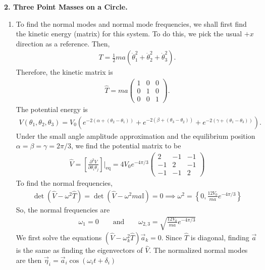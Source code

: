 \documentclass{article}
\theoremstyle{definition}
\newcommand{\p}{\partial}
\newcommand{\al}{\alpha}
\newcommand{\be}{\beta}
\newcommand{\f}[2]{\frac{#1}{#2}}
\newcommand{\lp}{\left(}
\newcommand{\rp}{\right)}
\newcommand{\lb}{\left[}
\newcommand{\rb}{\right]}
\newcommand{\lc}{\left\{}
\newcommand{\rc}{\right\}}
\begin{document}
\noindent \textbf{2. Three Point Masses on a Circle.} 
\begin{enumerate}[label=(\alph*)] 
	\item 	To find the normal modes and normal mode frequencies, we shall first find the kinetic energy (matrix) for this system. To do this, we pick the usual $+x$ direction as a reference. Then,
	\begin{align*}
	T = \f{1}{2}ma \lp \dot \theta_1^2 + \dot \theta_2^2 + \dot \theta_3^2 \rp.
	\end{align*}
	Therefore, the kinetic matrix is 
	\begin{align*}
	\hat T = ma \begin{pmatrix}
	1 & 0 & 0 \\ 0 & 1 & 0 \\ 0 & 0 & 1
	\end{pmatrix}.
	\end{align*}
	The potential energy is 
	\begin{align*}
	V(\theta_1,\theta_2,\theta_3) = V_0\lp e^{-2(\al + (\theta_2 - \theta_1))} + e^{-2(\be + (\theta_3 - \theta_2))}+ e^{-2(\gamma +  (\theta_1 - \theta_3))} \rp.
	\end{align*}
	Under the small angle amplitude approximation and the equilibrium position $\al=\be=\gamma = 2\pi/3$, we find the potential matrix to be 
	\begin{align*}
	\hat V = \lb \f{\p^2 V}{\p \theta_i \theta_j} \rb\bigg\vert_{\text{eq}} = 
	4V_0e^{-4\pi/3}\begin{pmatrix}
	2&-1&-1\\
	-1&2&-1\\
	-1&-1&2
	\end{pmatrix}
	\end{align*}
	To find the normal frequencies,
	\begin{align*}
	\det(\hat V - \omega^2 \hat T ) = \det(\hat V - \omega^2 ma \mathbb{I}) = 0 \implies \omega^2 = \lc 0, \f{12V_0}{ma}e^{-4\pi/3} \rc
	\end{align*}
	So, the normal frequencies are 
	\begin{align*}
	\boxed{\omega_1 = 0} \quad \quad \text{and} \quad\quad \boxed{\omega_{2,3} = \sqrt{\f{12 V_0}{ma} e^{-4\pi/3}}}
	\end{align*}
	We first solve the equations $(\hat V - \omega_k^2 \hat T)\vec{a}_k = 0$. Since $\hat T$ is diagonal, finding $\vec{a}$ is the same as finding the eigenvectors of $\hat V$. The normalized normal modes are then $\vec{\eta}_i = \vec{a}_i\cos(\omega_i t + \delta_i)$
	\begin{align*}

\end{align*}
\end{enumerate}
\end{document}
